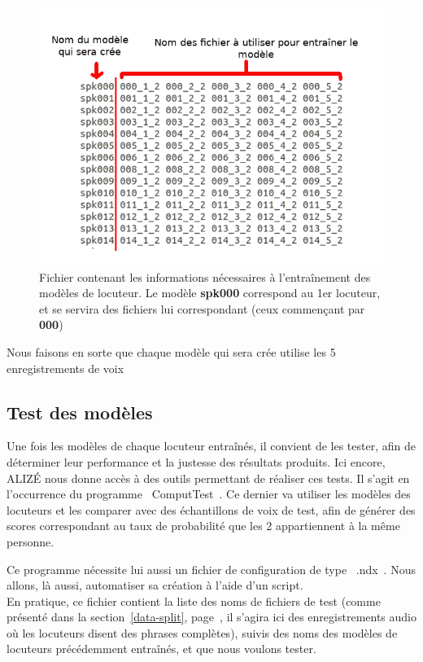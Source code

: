 \documentclass[a4paper, 12pt]{book}
\newcounter{program}[subsection]
\begin{document}
\begin{figure}[htbp]
  \centering
  \includegraphics[width=1\linewidth]{images/trainFile.png}
  \caption{Fichier contenant les informations nécessaires à l'entraînement des modèles de locuteur. Le modèle \textbf{spk000} correspond au 1er locuteur, et se servira des fichiers lui correspondant (ceux commençant par \textbf{000})}
\end{figure}

Nous faisons en sorte que chaque modèle qui sera crée utilise les 5 enregistrements de voix 

\subsection{Test des modèles}

Une fois les modèles de chaque locuteur entraînés, il convient de les tester, afin de déterminer leur performance et la justesse des résultats produits. Ici encore, ALIZÉ nous donne accès à des outils permettant de réaliser ces tests. Il s'agit en l'occurrence du programme \guillemotleft{}~ComputTest~\guillemotright{}. Ce dernier va utiliser les modèles des locuteurs et les comparer avec des échantillons de voix de test, afin de générer des scores correspondant au taux de probabilité que les 2 appartiennent à la même personne.

Ce programme nécessite lui aussi un fichier de configuration de type \guillemotleft{}~.ndx~\guillemotright{}. Nous allons, là aussi, automatiser sa création à l'aide d'un script.\\

En pratique, ce fichier contient la liste des noms de fichiers de test (comme présenté dans la section~\ref{data-split}, page~\pageref{data-split}, il s'agira ici des enregistrements audio où les locuteurs disent des phrases complètes), suivis des noms des modèles de locuteurs précédemment entraînés, et que nous voulons tester.
\end{document}

